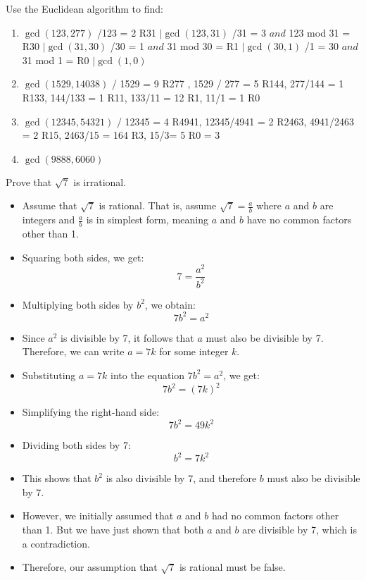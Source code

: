 \documentclass{article}
\begin{document}
 	 Use the Euclidean algorithm to find:
	\begin{enumerate}
		\item $\gcd(123, 277)$
		/123 = 2 R31 $| \gcd(123, 31)$
		/31 = 3 $and$ 123 mod 31 = R30 $| \gcd(31,30)$
		/30 = 1 $and$ 31 mod 30 = R1 $| \gcd(30,1)$
		/1 = 30 $and$ 31 mod 1 = R0 $| \gcd(1,0)$
		\item $\gcd(1529, 14038)$
		 / 1529 = 9 R277 , 1529 / 277 = 5 R144, 277/144 = 1 R133, 144/133 = 1 R11, 133/11 = 12 R1, 11/1 = 1 R0 
		\item $\gcd(12345, 54321)$
		 / 12345 = 4 R4941, 12345/4941 = 2 R2463, 4941/2463 = 2 R15, 2463/15 = 164 R3, 15/3= 5 R0 
		\subitem  = 3
		\item $\gcd(9888, 6060)$
	\end{enumerate}
	

	Prove that $\sqrt{7}$ is irrational.
\begin{itemize}
	\item Assume that \( \sqrt{7} \) is rational. That is, assume \( \sqrt{7} = \frac{a}{b} \) where \( a \) and \( b \) are integers and \( \frac{a}{b} \) is in simplest form, meaning \( a \) and \( b \) have no common factors other than 1.
	
	\item Squaring both sides, we get:
	\[
	7 = \frac{a^2}{b^2}
	\]
	
	\item Multiplying both sides by \( b^2 \), we obtain:
	\[
	7b^2 = a^2
	\]
	
	\item Since \( a^2 \) is divisible by 7, it follows that \( a \) must also be divisible by 7. Therefore, we can write \( a = 7k \) for some integer \( k \).
	
	\item Substituting \( a = 7k \) into the equation \( 7b^2 = a^2 \), we get:
	\[
	7b^2 = (7k)^2
	\]
	
	\item Simplifying the right-hand side:
	\[
	7b^2 = 49k^2
	\]
	
	\item Dividing both sides by 7:
	\[
	b^2 = 7k^2
	\]
	
	\item This shows that \( b^2 \) is also divisible by 7, and therefore \( b \) must also be divisible by 7.
	
	\item However, we initially assumed that \( a \) and \( b \) had no common factors other than 1. But we have just shown that both \( a \) and \( b \) are divisible by 7, which is a contradiction.
	
	\item Therefore, our assumption that \( \sqrt{7} \) is rational must be false.
	
\end{itemize}
\end{document}
